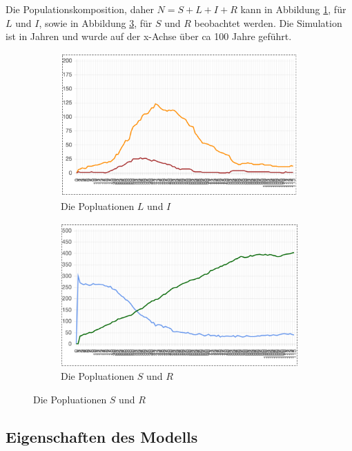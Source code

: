 \documentclass[paper=a4, fontsize=11pt, ngerman, abstract=on]{scrartcl}
\numberwithin{equation}{section} %
\numberwithin{figure}{section} %
\numberwithin{table}{section} %
\begin{document}
Die Populationskomposition, daher $N = S + L + I + R$ kann in Abbildung \ref{fig:l-i-population}, für $L$ und $I$, sowie in Abbildung \ref{fig:s-r-population}, für $S$ und $R$ beobachtet werden. Die Simulation ist in Jahren und wurde auf der x-Achse über ca 100 Jahre geführt.

\begin{figure}[ht]
  \centering
  \begin{subfigure}{.5\textwidth}
  \centering
  \includegraphics[width=.99\linewidth]{images/l-i-population}
  \caption{Die Popluationen $L$ und $I$}
  \label{fig:l-i-population}
  \end{subfigure}%
\begin{subfigure}{.5\textwidth}
  \centering
  \includegraphics[width=.99\linewidth]{images/s-r-population}
  \caption{Die Popluationen $S$ und $R$}
  \label{fig:s-r-population}
  \end{subfigure}
\end{figure}

\subsection{Eigenschaften des Modells}
\end{document}
